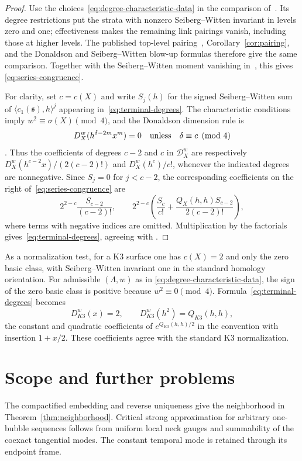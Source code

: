 \documentclass[11pt]{amsart}
\theoremstyle{definition}
\theoremstyle{remark}
\theoremstyle{plain}
\newcommand{\cD}{\mathcal{D}}
\begin{document}
\begin{proof}
Use the choices~\eqref{eq:degree-characteristic-data} in the comparison
of~\cite[Section~6.3]{FeehanLenessLevelOne}.  Its degree restrictions put
the strata with nonzero Seiberg--Witten invariant in levels zero and one;
effectiveness makes the remaining link pairings vanish, including those
at higher levels.  The published top-level pairing~\cite{FeehanLenessII},
Corollary~\ref{cor:pairing}, and the Donaldson and Seiberg--Witten blow-up
formulas therefore give the same comparison.  Together with the
Seiberg--Witten moment vanishing
in~\cite[Equation~(6.51)]{FeehanLenessLevelOne}, this gives
\eqref{eq:series-congruence}.

For clarity, set $c=c(X)$ and write $S_j(h)$ for the signed
Seiberg--Witten sum of $\langle c_1(\mathfrak s),h\rangle^j$ appearing
in~\eqref{eq:terminal-degrees}.  The characteristic conditions imply
$w^2\equiv\sigma(X)\pmod4$, and the Donaldson dimension rule is
\[
 D_X^w(h^{\delta-2m}x^m)=0\quad\hbox{unless}\quad
 \delta\equiv c\pmod4
\]
\cite[Equation~(6.53)]{FeehanLenessLevelOne}.  Thus the coefficients of
degrees $c-2$ and $c$ in $\cD_X^w$ are respectively
$D_X^w(h^{c-2}x)/(2(c-2)!)$ and $D_X^w(h^c)/c!$, whenever the indicated
degrees are nonnegative.  Since $S_j=0$ for $j<c-2$, the corresponding
coefficients on the right of~\eqref{eq:series-congruence} are
\[
 2^{2-c}\frac{S_{c-2}}{(c-2)!},\qquad
 2^{2-c}\left(\frac{S_c}{c!}
       +\frac{Q_X(h,h)S_{c-2}}{2(c-2)!}\right),
\]
where terms with negative indices are omitted.  Multiplication by the
factorials gives~\eqref{eq:terminal-degrees}, agreeing with
\cite[Equations~(6.57)--(6.58)]{FeehanLenessLevelOne}.
\end{proof}

As a normalization test, for a K3 surface one has $c(X)=2$ and only the zero
basic class, with Seiberg--Witten invariant one in the standard homology
orientation.  For admissible $(\Lambda,w)$ as in
\eqref{eq:degree-characteristic-data}, the sign of the zero basic class
is positive because $w^2\equiv0\pmod4$.
Formula~\eqref{eq:terminal-degrees} becomes
\begin{equation}\label{eq:k3-test}
 D^w_{K3}(x)=2,\qquad D^w_{K3}(h^2)=Q_{K3}(h,h),
\end{equation}
the constant and quadratic coefficients of $e^{Q_{K3}(h,h)/2}$ in the
convention with insertion $1+x/2$.  These coefficients agree with the
standard K3 normalization.

\section{Scope and further problems}\label{sec:discussion}
The compactified embedding and reverse uniqueness give the neighborhood
in Theorem~\ref{thm:neighborhood}.  Critical strong approximation for
arbitrary one-bubble sequences follows from uniform local neck gauges
and summability of the coexact tangential modes.  The constant temporal
mode is retained through its endpoint frame.
\end{document}
